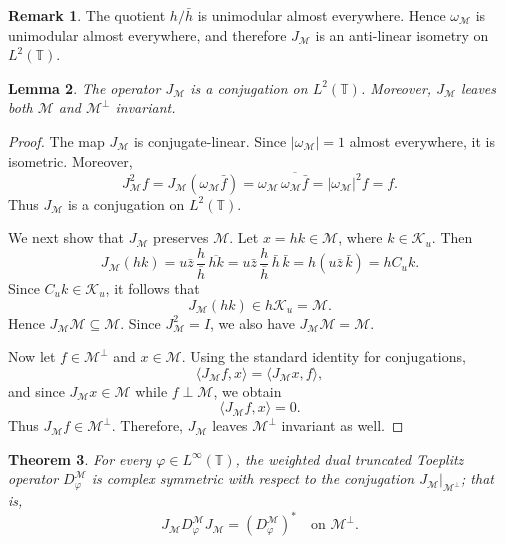 \documentclass[12pt]{amsart}
\newtheorem{theorem}{Theorem}[section]
\newtheorem{lemma}[theorem]{Lemma}
\theoremstyle{definition}
\newtheorem{remark}[theorem]{Remark}
\theoremstyle{remark}
\def \T{\mathbb{T}}
\newcommand{\clm}{\mathcal{M}}
\newcommand{\clk}{\mathcal{K}}
\newcommand{\vp}{\varphi}
\numberwithin{equation}{section}
\begin{document}
\begin{remark}
The quotient $h/\bar h$ is unimodular almost everywhere. Hence
$\omega_\clm$ is unimodular almost everywhere, and therefore $J_\clm$ is an anti-linear isometry on $L^2(\T)$.
\end{remark}

\begin{lemma}
The operator $J_\clm$ is a conjugation on $L^2(\T)$. Moreover,
$J_\clm$ leaves both $\clm$ and $\clm^\perp$ invariant.
\end{lemma}

\begin{proof}
The map $J_\clm$ is conjugate-linear. Since $|\omega_\clm|=1$ almost everywhere, it is isometric. Moreover,
\[
J_\clm^2 f
=
J_\clm(\omega_\clm\bar f)
=
\omega_\clm\,\overline{\omega_\clm\bar f}
=
|\omega_\clm|^2 f
=
f.
\]
Thus $J_\clm$ is a conjugation on $L^2(\T)$.

We next show that $J_\clm$ preserves $\clm$. Let $x=hk\in\clm$, where $k\in\clk_u$. Then
\[
J_\clm(hk)
=
u\bar{z}\,\frac{h}{\bar h}\,\overline{hk}
=
u\bar{z}\,\frac{h}{\bar h}\,\bar h\,\bar k
=
h(u\bar{z}\,\bar k)
=
hC_u k.
\]
Since $C_u k\in\clk_u$, it follows that
\[
J_\clm(hk)\in h\clk_u=\clm.
\]
Hence $J_\clm\clm\subseteq \clm$. Since $J_\clm^2=I$, we also have $J_\clm\clm=\clm$.

Now let $f\in\clm^\perp$ and $x\in\clm$. Using the standard identity for conjugations,
\[
\langle J_\clm f,x\rangle
=
\langle J_\clm x,f\rangle,
\]
and since $J_\clm x\in\clm$ while $f\perp\clm$, we obtain
\[
\langle J_\clm f,x\rangle=0.
\]
Thus $J_\clm f\in\clm^\perp$. Therefore, $J_\clm$ leaves
$\clm^\perp$ invariant as well.
\end{proof}

\begin{theorem}\label{thm:complex_symmetry}
For every $\vp\in L^\infty(\T)$, the weighted dual truncated Toeplitz
operator $D_\vp^\clm$ is complex symmetric with respect to the
conjugation $J_\clm|_{\clm^\perp}$; that is,
\[
J_\clm D_\vp^\clm J_\clm
=
(D_\vp^\clm)^*
\quad \text{on } \clm^\perp.
\]
\end{theorem}
\end{document}
